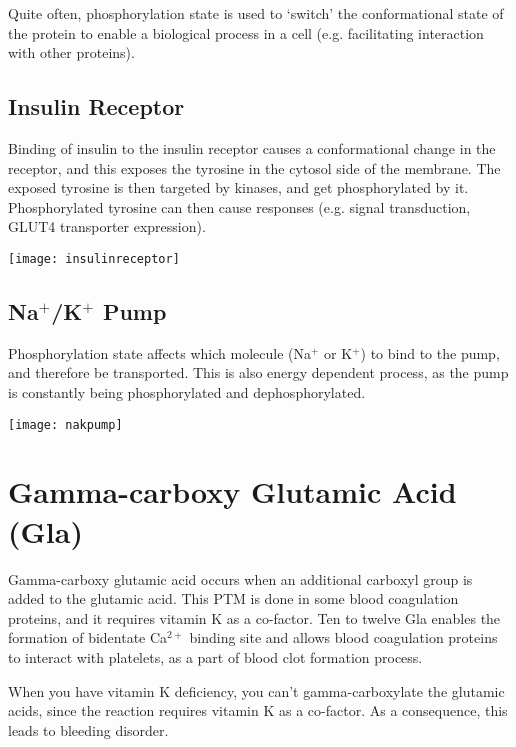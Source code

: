 Quite often, phosphorylation state is used to `switch' the conformational state of the protein to enable a biological process in a cell (e.g. facilitating interaction with other proteins).

\subsection{Insulin Receptor}

Binding of insulin to the insulin receptor causes a conformational change in the receptor, and this exposes the tyrosine in the cytosol side of the membrane.
The exposed tyrosine is then targeted by kinases, and get phosphorylated by it.
Phosphorylated tyrosine can then cause responses (e.g. signal transduction, GLUT4 transporter expression).

\begin{center}
\texttt{[image: insulinreceptor]}
\end{center}

\subsection{Na$^+$/K$^+$ Pump}

Phosphorylation state affects which molecule (Na$^+$ or K$^+$) to bind to the pump, and therefore be transported.
This is also energy dependent process, as the pump is constantly being phosphorylated and dephosphorylated.

\begin{center}
\texttt{[image: nakpump]}
\end{center}

\section{Gamma-carboxy Glutamic Acid (Gla)}

Gamma-carboxy glutamic acid occurs when an additional carboxyl group is added to the glutamic acid.
This PTM is done in some blood coagulation proteins, and it requires vitamin K as a co-factor.
Ten to twelve Gla enables the formation of bidentate Ca$^{2+}$ binding site and allows blood coagulation proteins to interact with platelets, as a part of blood clot formation process.

When you have vitamin K deficiency, you can't gamma-carboxylate the glutamic acids, since the reaction requires vitamin K as a co-factor.
As a consequence, this leads to bleeding disorder.

